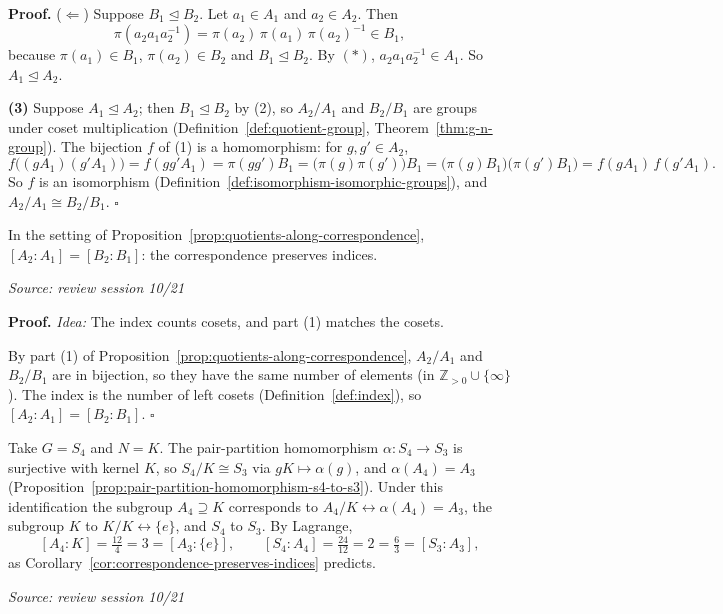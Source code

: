 \documentclass[11pt]{report}
\renewenvironment{proof}[1][Proof]{\noindent\textbf{#1.} }{\hfill$\square$\par\vspace{5pt}}
\newcommand{\srcline}[1]{\par\hfill{\footnotesize\textit{Source: #1}}}
\begin{document}
\begin{proof}
($\Leftarrow$) Suppose $B_1 \trianglelefteq B_2$. Let $a_1 \in A_1$ and $a_2 \in A_2$. Then
\[ \pi(a_2a_1a_2^{-1}) = \pi(a_2)\,\pi(a_1)\,\pi(a_2)^{-1} \in B_1, \]
because $\pi(a_1) \in B_1$, $\pi(a_2) \in B_2$ and $B_1 \trianglelefteq B_2$. By $(\ast)$, $a_2a_1a_2^{-1} \in A_1$. So $A_1 \trianglelefteq A_2$.

\textbf{(3)} Suppose $A_1 \trianglelefteq A_2$; then $B_1 \trianglelefteq B_2$ by (2), so $A_2/A_1$ and $B_2/B_1$ are groups under coset multiplication (Definition~\ref{def:quotient-group}, Theorem~\ref{thm:g-n-group}). The bijection $f$ of (1) is a homomorphism: for $g, g' \in A_2$,
\[ f\big((gA_1)(g'A_1)\big) = f(gg'A_1) = \pi(gg')B_1 = \big(\pi(g)\pi(g')\big)B_1 = \big(\pi(g)B_1\big)\big(\pi(g')B_1\big) = f(gA_1)\,f(g'A_1). \]
So $f$ is an isomorphism (Definition~\ref{def:isomorphism-isomorphic-groups}), and $A_2/A_1 \cong B_2/B_1$.
\end{proof}

\begin{corbox}\label{cor:correspondence-preserves-indices}
In the setting of Proposition~\ref{prop:quotients-along-correspondence}, $[A_2 : A_1] = [B_2 : B_1]$: the correspondence preserves indices.
\srcline{review session 10/21}
\end{corbox}

\begin{proof}
\textit{Idea:} The index counts cosets, and part (1) matches the cosets.\par
By part (1) of Proposition~\ref{prop:quotients-along-correspondence}, $A_2/A_1$ and $B_2/B_1$ are in bijection, so they have the same number of elements (in $\mathbb{Z}_{>0} \cup \{\infty\}$). The index is the number of left cosets (Definition~\ref{def:index}), so $[A_2 : A_1] = [B_2 : B_1]$.
\end{proof}

\begin{exbox}\label{ex:correspondence-indices-s4-k}
Take $G = S_4$ and $N = K$. The pair-partition homomorphism $\alpha: S_4 \to S_3$ is surjective with kernel $K$, so $S_4/K \cong S_3$ via $gK \mapsto \alpha(g)$, and $\alpha(A_4) = A_3$ (Proposition~\ref{prop:pair-partition-homomorphism-s4-to-s3}). Under this identification the subgroup $A_4 \supseteq K$ corresponds to $A_4/K \leftrightarrow \alpha(A_4) = A_3$, the subgroup $K$ to $K/K \leftrightarrow \{e\}$, and $S_4$ to $S_3$. By Lagrange,
\[ [A_4 : K] = \tfrac{12}{4} = 3 = [A_3 : \{e\}], \qquad [S_4 : A_4] = \tfrac{24}{12} = 2 = \tfrac{6}{3} = [S_3 : A_3], \]
as Corollary~\ref{cor:correspondence-preserves-indices} predicts.
\srcline{review session 10/21}
\end{exbox}
\end{document}
